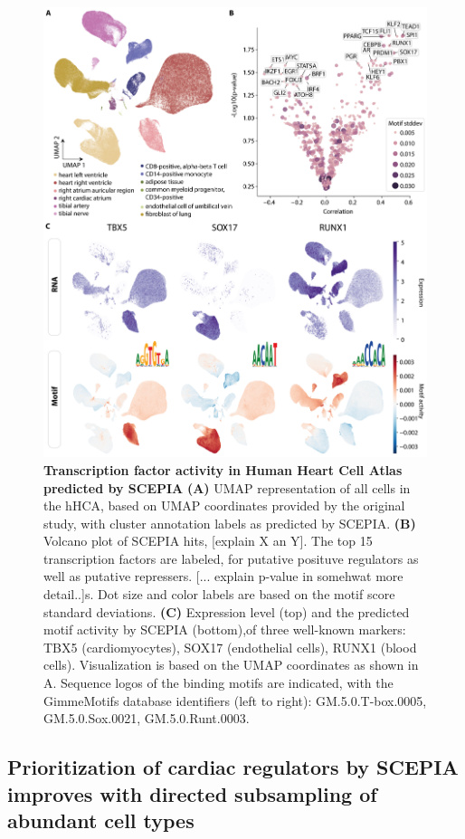 \begin{figure}
    \centering
    \includegraphics[width=0.75\linewidth]{ch.scepia/imgs/SCEPIA_allCells_v10_Myriad_Figure3.png}
    \caption{\textbf{Transcription factor activity in Human Heart Cell Atlas predicted by SCEPIA} \textbf{(A)} UMAP representation of all cells in the hHCA, based on UMAP coordinates provided by the original study\cite{Kanemaru2023}, with cluster annotation labels as predicted by SCEPIA. \textbf{(B) }Volcano plot of SCEPIA hits, [explain X an Y]. The top 15 transcription factors are labeled, for putative posituve regulators as well as putative repressers. [... explain p-value in somehwat more detail..]s. Dot size and color labels are based on the motif score standard deviations.  \textbf{(C) }Expression level (top) and the predicted motif activity by SCEPIA (bottom),of three well-known markers: TBX5 (cardiomyocytes), SOX17 (endothelial cells), RUNX1 (blood cells). Visualization is based on the UMAP coordinates as shown in A. Sequence logos of the binding motifs are indicated, with the GimmeMotifs database identifiers (left to right): GM.5.0.T-box.0005, GM.5.0.Sox.0021, GM.5.0.Runt.0003. }
    \label{fig:scepia_hhca1}
\end{figure}


\subsection{Prioritization of cardiac regulators by SCEPIA improves with directed subsampling of abundant cell types}

